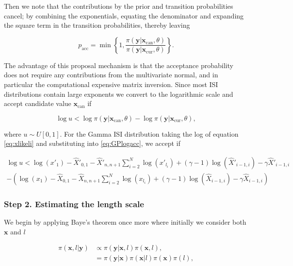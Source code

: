 \documentclass[../main.tex]{subfiles}
\begin{document}
Then we note that the contributions by the prior and transition probabilities cancel; by combining the exponentials, equating the denominator and expanding the square term in the transition probabilities, thereby leaving 


\begin{equation}
p_{\mathrm{acc}} = \min \left\{ 1, \frac{\pi \left( \mathbf{y} | \mathbf{x}_{\mathrm{can}} ,\theta \right)} {\pi \left( \mathbf{y} | \mathbf{x}_{\mathrm{cur}} ,\theta \right)} \right\}.
\end{equation}   

The advantage of this proposal mechanism is that the acceptance probability does not require any contributions from the multivariate normal, and in particular the computational expensive matrix inversion. Since most ISI distributions contain large exponents we convert to the logarithmic scale and accept candidate value $\mathbf{x}_{\mathrm{can}}$ if 

\begin{equation}\label{eq:GPlogacc}
\log u < \log \pi \left( \mathbf{y} | \mathbf{x}_{\mathrm{can}} ,\theta \right) - \log \pi \left( \mathbf{y} | \mathbf{x}_{\mathrm{cur}} ,\theta \right),
\end{equation}

where $u \sim U[0,1]$. For the Gamma ISI distribution taking the log of equation \eqref{eq:xlikeli} and substituting into \eqref{eq:GPlogacc}, we accept if

\begin{multline}
\log u < \log \left( x'_{1} \right) -\hat X'_{0,1} -\hat X'_{n, n+1} \sum^{N}_{i=2} \log \left( x'_{l_i}\right ) + \left(\gamma - 1 \right) \log\left( \hat X'_{i-1,i} \right) -\gamma \hat X'_{i-1,i} \\ 
 - \left(\log \left( x_{1} \right) -\hat X_{0,1} -\hat X_{n, n+1} \sum^{N}_{i=2} \log \left( x_{l_i}\right ) + \left(\gamma - 1 \right) \log\left( \hat X_{i-1,i} \right) -\gamma \hat X_{i-1,i} \right)
\end{multline}

\subsubsection{Step 2. Estimating the length scale}
We begin by applying Baye's theorem once more where initially we consider both $\mathbf{x}$ and $l$
 
 \begin{align}
 \pi ( \mathbf{x}, l | \mathbf{y} )  &\propto \pi(\mathbf{y} | \mathbf{x}, l )  \pi(\mathbf{x}, l),\\
 & = \pi (\mathbf{y} | \mathbf{x}) \pi (\mathbf{x} | l) \pi(\mathbf{x}) \pi(l), \label{eq:BayesL}
 \end{align}
 
\end{document}

